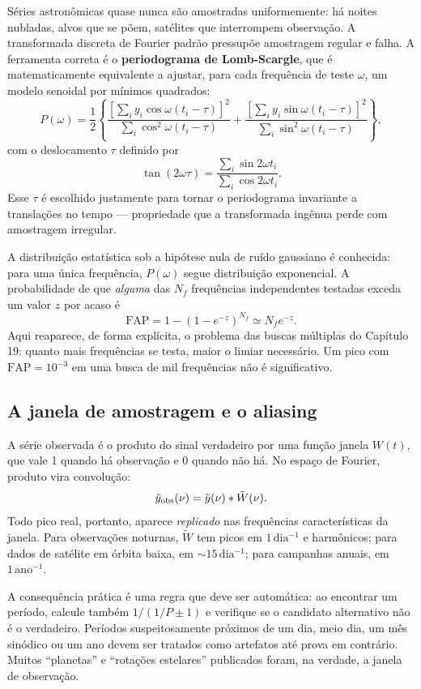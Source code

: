 \documentclass[11pt,a4paper]{article}
\begin{document}
Séries astronômicas quase nunca são amostradas uniformemente: há noites nubladas, alvos que se põem, satélites que interrompem observação. A transformada discreta de Fourier padrão pressupõe amostragem regular e falha. A ferramenta correta é o \textbf{periodograma de Lomb-Scargle}, que é matematicamente equivalente a ajustar, para cada frequência de teste $\omega$, um modelo senoidal por mínimos quadrados:
\[
P(\omega)=\frac{1}{2}\left\{\frac{\left[\sum_i y_i\cos\omega(t_i-\tau)\right]^{2}}{\sum_i\cos^{2}\omega(t_i-\tau)}
+\frac{\left[\sum_i y_i\sin\omega(t_i-\tau)\right]^{2}}{\sum_i\sin^{2}\omega(t_i-\tau)}\right\},
\]
com o deslocamento $\tau$ definido por
\[
\tan(2\omega\tau)=\frac{\sum_i\sin2\omega t_i}{\sum_i\cos2\omega t_i}.
\]
Esse $\tau$ é escolhido justamente para tornar o periodograma invariante a translações no tempo --- propriedade que a transformada ingênua perde com amostragem irregular.

A distribuição estatística sob a hipótese nula de ruído gaussiano é conhecida: para uma única frequência, $P(\omega)$ segue distribuição exponencial. A probabilidade de que \emph{alguma} das $N_f$ frequências independentes testadas exceda um valor $z$ por acaso é
\[
\mathrm{FAP}=1-\left(1-e^{-z}\right)^{N_f}\simeq N_fe^{-z}.
\]
Aqui reaparece, de forma explícita, o problema das buscas múltiplas do Capítulo 19: quanto mais frequências se testa, maior o limiar necessário. Um pico com $\mathrm{FAP}=10^{-3}$ em uma busca de mil frequências não é significativo.

\subsection*{A janela de amostragem e o aliasing}

A série observada é o produto do sinal verdadeiro por uma função janela $W(t)$, que vale 1 quando há observação e 0 quando não há. No espaço de Fourier, produto vira convolução:
\[
\tilde{y}_{\rm obs}(\nu)=\tilde{y}(\nu)*\tilde{W}(\nu).
\]
Todo pico real, portanto, aparece \emph{replicado} nas frequências características da janela. Para observações noturnas, $\tilde{W}$ tem picos em $1\,\mathrm{dia^{-1}}$ e harmônicos; para dados de satélite em órbita baixa, em $\sim15\,\mathrm{dia^{-1}}$; para campanhas anuais, em $1\,\mathrm{ano^{-1}}$.

A consequência prática é uma regra que deve ser automática: ao encontrar um período, calcule também $1/(1/P\pm1)$ e verifique se o candidato alternativo não é o verdadeiro. Períodos suspeitosamente próximos de um dia, meio dia, um mês sinódico ou um ano devem ser tratados como artefatos até prova em contrário. Muitos ``planetas'' e ``rotações estelares'' publicados foram, na verdade, a janela de observação.
\end{document}
